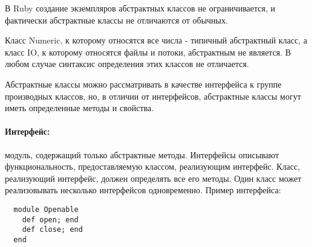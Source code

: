 В Ruby создание экземпляров абстрактных классов не ограничивается, и фактически абстрактные классы не отличаются от обычных.
\begin{note}
  Класс Numeric, к которому относятся все числа - типичный абстрактный класс, а класс IO, к которому относятся файлы и потоки, абстрактным не является. В любом случае синтаксис определения этих классов не отличается.
\end{note}

Абстрактные классы можно рассматривать в качестве интерфейса к группе производных классов, но, в отличии от интерфейсов, абстрактные классы могут иметь определенные методы и свойства.

\paragraph*{Интерфейс:} модуль, содержащий только абстрактные методы. Интерфейсы описывают функциональность, предоставляемую классом, реализующим интерфейс. Класс, реализующий интерфейс, должен определять все его методы. Один класс может реализовывать несколько интерфейсов одновременно.
Пример интерфейса:
\begin{verbatim}
  module Openable
    def open; end
    def close; end
  end
\end{verbatim}